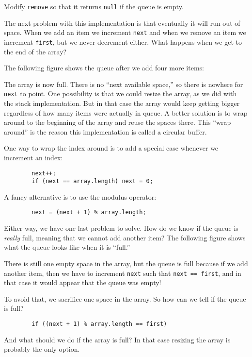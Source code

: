 \begin{exercise}
Modify {\tt remove} so that it returns {\tt null}
if the queue is empty.
\end{exercise}

The next problem with this implementation is that eventually it
will run out of space.  When we add an item we increment {\tt next}
and when we remove an item we increment {\tt first}, but we never
decrement either.  What happens when we get to the end of the
array?

The following figure shows the queue after we add four more items:


The array is now full.  There is no ``next available space,'' so there
is nowhere for {\tt next} to point.  One possibility is that we could
resize the array, as we did with the stack implementation.  But in that
case the array would keep getting bigger regardless of how many items
were actually in queue.  A better solution is to wrap around to the
beginning of the array and reuse the spaces there.  This ``wrap around''
is the reason this implementation is called a circular buffer.

One way to wrap the index around is to add a special case whenever
we increment an index:

\begin{verbatim}
        next++;
        if (next == array.length) next = 0; 
\end{verbatim}
%
A fancy alternative is to use the modulus operator:

\begin{verbatim}
        next = (next + 1) % array.length;
\end{verbatim}
%
Either way, we have one last problem to solve.  How do we know
if the queue is {\em really} full, meaning that we cannot add
another item?  The following figure shows what the queue looks
like when it is ``full.''


There is still one empty space in the array, but the queue is
full because if we add another item, then we have to increment
{\tt next} such that {\tt next == first}, and in that case it
would appear that the queue was empty!

To avoid that, we sacrifice one space in the array.  So how
can we tell if the queue is full?

\begin{verbatim}
        if ((next + 1) % array.length == first)
\end{verbatim}
%
And what should we do if the array is full?  In that case resizing
the array is probably the only option.


